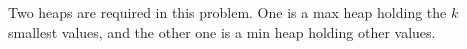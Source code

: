 Two heaps are required in this problem.
One is a max heap holding the $k$ smallest values, 
and the other one is a min heap holding other values.
